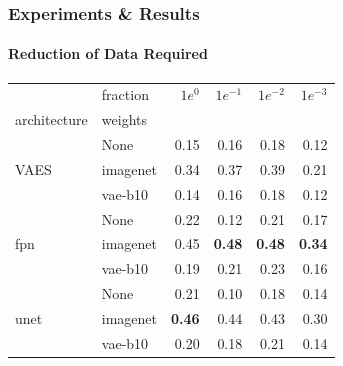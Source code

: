 \documentclass[t,aspectratio=169]{beamer}
\begin{document}
\begin{frame}[fragile]
  \frametitle{Experiments \& Results}
  \framesubtitle{Reduction of Data Required}
  \vspace*{-0.5cm}
  \begin{table}[ht]
    \centering
    \color{black}
    \begin{tabular}{llrrrr}
      \toprule
                               & fraction & $1e^{0}$      & $1e^{-1}$     & $1e^{-2}$     & $1e^{-3}$     \\
      architecture             & weights  &               &               &               &               \\
      \midrule
      \multirow[t]{3}{*}{VAES} & None     & 0.15          & 0.16          & 0.18          & 0.12          \\
                               & imagenet & 0.34          & 0.37          & 0.39          & 0.21          \\
                               & vae-b10  & 0.14          & 0.16          & 0.18          & 0.12          \\
      \cline{1-6}
      \multirow[t]{3}{*}{fpn}  & None     & 0.22          & 0.12          & 0.21          & 0.17          \\
                               & imagenet & 0.45          & \textbf{0.48} & \textbf{0.48} & \textbf{0.34} \\
                               & vae-b10  & 0.19          & 0.21          & 0.23          & 0.16          \\
      \cline{1-6}
      \multirow[t]{3}{*}{unet} & None     & 0.21          & 0.10          & 0.18          & 0.14          \\
                               & imagenet & \textbf{0.46} & 0.44          & 0.43          & 0.30          \\
                               & vae-b10  & 0.20          & 0.18          & 0.21          & 0.14          \\
      \cline{1-6}
      \bottomrule
    \end{tabular}
    
  \end{table}
  
\end{frame}
\end{document}
